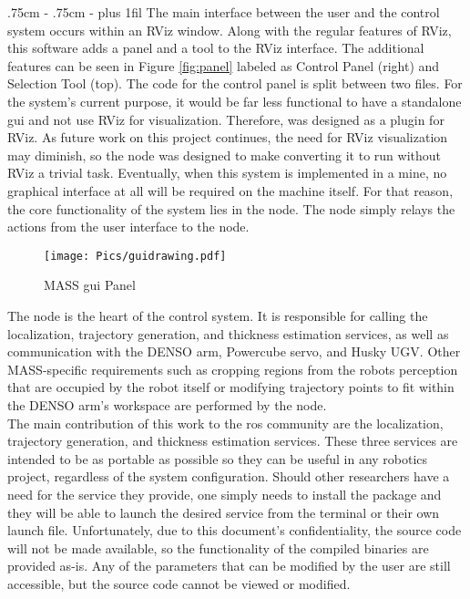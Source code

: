 {\leftskip 5pt \rightskip .75cm \parfillskip-\rightskip
\nobreak\medskip
\etocskipfirstprefix}
{\leftskip 5pt \rightskip .75cm \parfillskip-\rightskip
\pagebreak[1]\smallskip}
{\normalsize
\etocname\NoDotsOrPage}
{\parfillskip 0pt plus 1fil\relax }
\etocsettocstyle{\bigskip\medskip}{\medskip\vfill}
\def\contentsname{\empty}
\tableofcontents
The main interface between the user and the control system occurs within an RViz window. Along with the regular features of RViz, this software adds a panel and a tool to the RViz interface. The additional features can be seen in Figure \ref{fig:panel} labeled as Control Panel (right) and Selection Tool (top). The code for the control panel is split between two files. For the system's current purpose, it would be far less functional to have a standalone \acrshort{gui} and not use RViz for visualization. Therefore,  was designed as a plugin for RViz. As future work on this project continues, the need for RViz visualization may diminish, so the node was designed to make converting it to run without RViz a trivial task. Eventually, when this system is implemented in a mine, no graphical interface at all will be required on the machine itself. For that reason, the core functionality of the system lies in the  node. The  node simply relays the actions from the user interface to the  node.\\

\begin{figure}[ht!]
    \centering
    \texttt{[image: Pics/guidrawing.pdf]}
    \caption{MASS \acrshort{gui} Panel}
    \label{fig:thegui}
\end{figure}

The  node is the heart of the control system. It is responsible for calling the localization, trajectory generation, and thickness estimation services, as well as communication with the DENSO arm, Powercube servo, and Husky UGV. Other MASS-specific requirements such as cropping regions from the robots perception that are occupied by the robot itself or  modifying trajectory points to fit within the DENSO arm's workspace are performed by the  node. \\

The main contribution of this work to the \acrshort{ros} community are the localization, trajectory generation, and thickness estimation services. These three services are intended to be as portable as possible so they can be useful in any robotics project, regardless of the system configuration. Should other researchers have a need for the service they provide, one simply needs to install the package and they will be able to launch the desired service from the terminal or their own launch file. Unfortunately, due to this document's confidentiality, the source code will not be made available, so the functionality of the compiled binaries are provided as-is. Any of the parameters that can be modified by the user are still accessible, but the source code cannot be viewed or modified.\\
